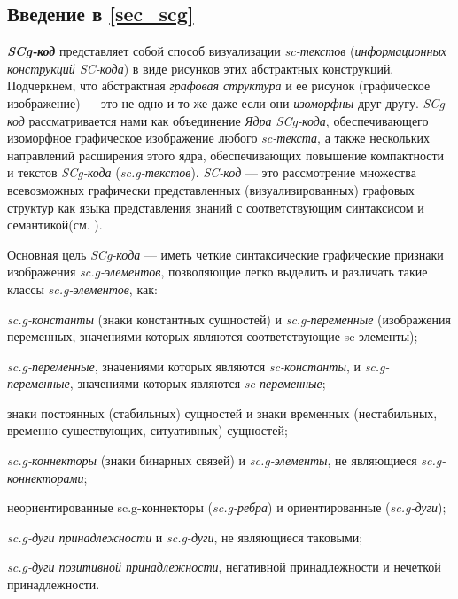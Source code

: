 \subsection*{Введение в \ref{sec_scg}}

\begin{SCn}
\end{SCn}

\textbf{\textit{SCg-код}} представляет собой способ визуализации \textit{sc-текстов} (\textit{информационных конструкций SC-кода}) в виде рисунков этих абстрактных конструкций. Подчеркнем, что абстрактная \textit{графовая структура} и ее рисунок (графическое изображение) --- это не одно и то же даже если они \textit{изоморфны} друг другу. \mbox{\textit{SCg-код}} рассматривается нами как объединение \textit{Ядра SCg-кода}, обеспечивающего изоморфное графическое изображение любого \textit{sc-текста}, а также нескольких направлений расширения этого ядра, обеспечивающих повышение компактности и  текстов \textit{SCg-кода} (\textit{sc.g-текстов}).
\textit{SC-код} --- это рассмотрение множества всевозможных графически представленных (визуализированных) графовых структур как  языка представления знаний с соответствующим синтаксисом и семантикой(см. ).

Основная цель \textit{SCg-кода} --- иметь четкие синтаксические графические признаки изображения \textit{sc.g-элементов}, позволяющие легко выделить и различать такие классы \textit{sc.g-элементов}, как:
\begin{textitemize}
	\item \textit{sc.g-константы} (знаки константных сущностей) и \textit{sc.g-переменные} (изображения переменных, значениями которых являются соответствующие sc-элементы);
	\item \textit{sc.g-переменные}, значениями которых являются \textit{sc-константы}, и \textit{sc.g-переменные}, значениями которых являются \textit{sc-переменные};
	\item знаки постоянных (стабильных) сущностей и знаки временных (нестабильных, временно существующих, ситуативных) сущностей;
	\item \textit{sc.g-коннекторы} (знаки бинарных связей) и \textit{sc.g-элементы}, не являющиеся \textit{sc.g-коннекторами};
	\item неориентированные sc.g-коннекторы (\textit{sc.g-ребра}) и ориентированные (\textit{sc.g-дуги});
	\item \textit{sc.g-дуги принадлежности} и \textit{sc.g-дуги}, не являющиеся таковыми;
	\item \textit{sc.g-дуги позитивной принадлежности}, негативной принадлежности и нечеткой принадлежности.
\end{textitemize}

